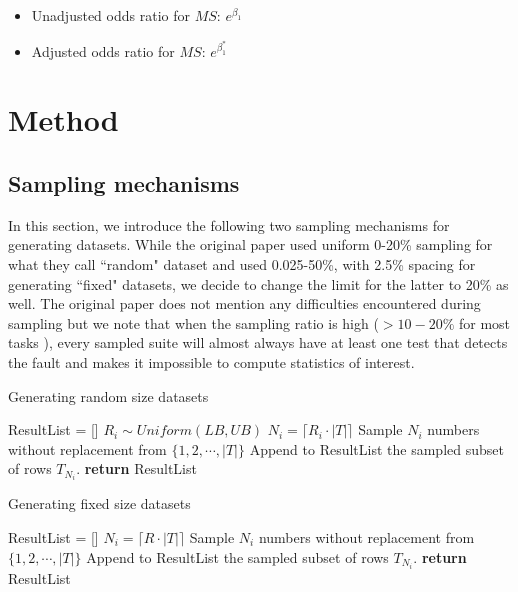 \documentclass[10pt,letterpaper]{article}
\begin{document}
\begin{itemize}
\begin{itemize}
    \item
    Unadjusted odds ratio for $MS$: $e^{\beta_1}$

    
    \item
    
     Adjusted odds ratio for $MS$: $e^{\beta^*_1}$
    
\end{itemize}




\end{itemize}



\section{Method}


\subsection{Sampling mechanisms}
In this section, we introduce the following two sampling mechanisms for generating datasets. While the original paper used uniform 0-20\% sampling for what they call ``random" dataset and used 0.025-50\%, with 2.5\%  
spacing for generating ``fixed" datasets, we decide to change the limit for the latter to 20\% as well. The original paper does not mention any difficulties encountered during sampling but we note that when the sampling ratio is high ($>10-20\%$ for most tasks ), every sampled suite will almost always have at least one test that detects the fault and makes it impossible to compute statistics of interest.

\begin{algorithm}
\caption{Generating random size datasets}\label{alg:random_size}
\begin{algorithmic}[1]
\State ResultList  = []
\State $R_i \sim Uniform(LB,UB)$
\State $N_i =\lceil R_i \cdot |T| \rceil$
\State Sample $N_i$ numbers without replacement from $\{1,2,\cdots, |T|\}$
\State Append to ResultList the sampled subset of rows $T_{N_i}$.
\EndFor
\State \textbf{return} ResultList
\EndProcedure
\end{algorithmic}
\end{algorithm}


\begin{algorithm}
\caption{Generating fixed size datasets}\label{alg:random_size}
\begin{algorithmic}[1]
\State ResultList  = []
\State $N_i =\lceil R \cdot |T| \rceil$
\State Sample $N_i$ numbers without replacement from $\{1,2,\cdots, |T|\}$
\State Append to ResultList the sampled subset of rows $T_{N_i}$.
\EndFor
\State \textbf{return} ResultList
\EndProcedure
\end{algorithmic}
\end{algorithm}
\end{document}

